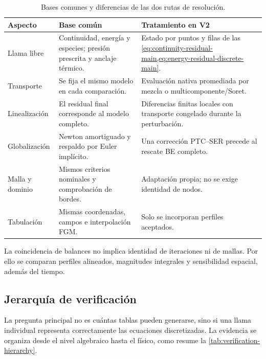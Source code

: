 \documentclass[12pt,a4paper,twoside,openany]{book}
\begin{document}
\begin{table}[htbp]
\centering
\small
\caption{Bases comunes y diferencias de las dos rutas de resolución.}
\label{tab:cantera-v2-equations}
\begin{tabularx}{\textwidth}{@{}p{}YY@{}}
\toprule
\textbf{Aspecto} & \textbf{Base común} & \textbf{Tratamiento en V2}\\
\midrule
Llama libre & Continuidad, energía y especies; presión prescrita y anclaje
térmico. & Estado por puntos y filas de las
\cref{eq:continuity-residual-main,eq:energy-residual-discrete-main}.\\
Transporte & Se fija el mismo modelo en cada comparación. & Evaluación nativa
promediada por mezcla o multicomponente/Soret.\\
Linealización & El residual final corresponde al modelo completo. &
Diferencias finitas locales con transporte congelado durante la perturbación.\\
Globalización & Newton amortiguado y respaldo por Euler implícito. &
Una corrección PTC--SER precede al rescate BE completo.\\
Malla y dominio & Mismos criterios nominales y comprobación de bordes. &
Adaptación propia; no se exige identidad de nodos.\\
Tabulación & Mismas coordenadas, campos e interpolación FGM. &
Solo se incorporan perfiles aceptados.\\
\bottomrule
\end{tabularx}
\end{table}

La coincidencia de balances no implica identidad de iteraciones ni de mallas.
Por ello se comparan perfiles alineados, magnitudes integrales y sensibilidad
espacial, además del tiempo.

\subsection{Jerarquía de verificación}

La pregunta principal no es cuántas tablas pueden generarse, sino si una llama
individual representa correctamente las ecuaciones discretizadas. La evidencia
se organiza desde el nivel algebraico hasta el físico, como resume la
\cref{tab:verification-hierarchy}.
\end{document}
